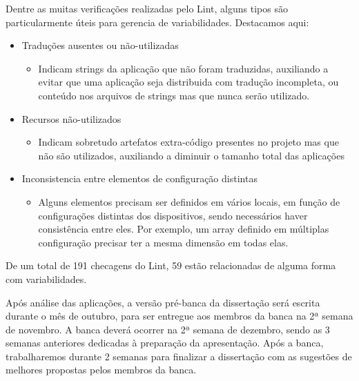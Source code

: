 Dentre as muitas verificações realizadas pelo Lint, alguns tipos são particularmente
úteis para gerencia de variabilidades. Destacamos aqui:
\begin{itemize}
    \item Traduções ausentes ou não-utilizadas
        \begin{itemize}
            \item Indicam strings da aplicação que não foram traduzidas, auxiliando
                a evitar que uma aplicação seja distribuida com tradução incompleta,
                ou conteúdo nos arquivos de strings mas que nunca serão utilizado.
        \end{itemize}
    \item Recursos não-utilizados
        \begin{itemize}
            \item Indicam sobretudo artefatos extra-código presentes no projeto
                mas que não são utilizados, auxiliando a diminuir o tamanho total das aplicações 
        \end{itemize}
    \item Inconsistencia entre elementos de configuração distintas
        \begin{itemize}
            \item Alguns elementos precisam ser definidos em vários locais, em função
                de configurações distintas dos dispositivos, sendo necessários haver
                consistência entre eles. Por exemplo, um array definido em múltiplas
                configuração precisar ter  a mesma dimensão em todas elas.
        \end{itemize}
\end{itemize}

De um total de 191 checagens do Lint, 59 estão relacionadas de alguma forma com
variabilidades.

Após análise das aplicações, a versão pré-banca da dissertação será escrita durante
o mês de
outubro, para ser entregue aos membros da banca na 2ª semana de novembro. A banca
deverá ocorrer na 2ª semana de dezembro, sendo as 3 semanas anteriores dedicadas
à preparação da apresentação. Após a banca, trabalharemos durante 2 semanas para
finalizar a dissertação com as sugestões de melhores propostas pelos membros da
banca. 

